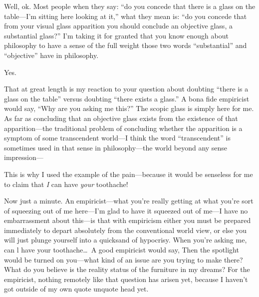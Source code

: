  Well, ok. Most people when they say: 
\enquote{do you concede that there is a glass on the table---I'm sitting here looking at it,} what they 
mean is: \enquote{do you concede that from your visual glass apparition you should conclude an objective glass, a substantial glass?} I'm taking it for 
granted that you know enough about philosophy to have a sense of the 
full weight those two words \enquote{substantial} and \enquote{objective} have in 
philosophy. 

 Yes. 

 That at great length is my reaction to your question about 
doubting \enquote{there is a glass on the table} versus doubting \enquote{there exists a glass.} 
A bona fide empiricist would say, \enquote{Why are you asking me this?} 
The scopic glass is simply here for me. As far as concluding that an 
objective glass exists from the existence of that apparition---the traditional 
problem of concluding whether the apparition is a symptom of 
some transcendent world---I think the word \enquote{transcendent} is sometimes 
used in that sense in philosophy---the world beyond any sense 
impression--- 

 This is why I used the example of the pain---because it 
would be senseless for me to claim that \emph{I} can have \emph{your} toothache! 

 Now just a minute. An empiricist---what you're really getting 
at what you're sort of squeezing out of me here---I'm glad to have it 
squeezed out of me---I have no embarrassment about this---is that with 
empiricism either you must be prepared immediately to depart 
absolutely from the conventional world view, or else you will just plunge 
yourself into a quicksand of hypocrisy. When you're asking me, can l 
have your toothache\ldots\  A good empiricist would say, 
 Then the spotlight would be 
turned on you---what kind of an issue are you trying to make there? 
What do you believe is the reality status of the furniture in my dreams? 
For the empiricist, nothing remotely like that question has arisen yet, 
because I haven't got outside of my own quote unquote head yet. 

